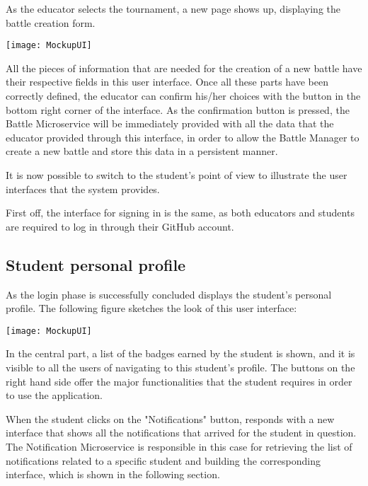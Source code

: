 As the educator selects the tournament, a new page shows up, displaying the battle creation form.

\begin{center}
	\texttt{[image: MockupUI]}
\end{center}

All the pieces of information that are needed for the creation of a new battle have their respective fields in this user interface. Once all these parts have been correctly defined, the educator can confirm his/her choices with the button in the bottom right corner of the interface. 
As the confirmation button is pressed, the Battle Microservice will be immediately provided with all the data that the educator provided through this interface, in order to allow the Battle Manager to create a new battle and store this data in a persistent manner.

It is now possible to switch to the student's point of view to illustrate the user interfaces that the \app system provides.

First off, the interface for signing in \app is the same, as both educators and students are required to log in through their GitHub account.

\subsection{Student personal profile}
As the login phase is successfully concluded \app displays the student's personal profile. The following figure sketches the look of this user interface:

\begin{center}
	\texttt{[image: MockupUI]}
\end{center}

In the central part, a list of the badges earned by the student is shown, and it is visible to all the users of \app navigating to this student's profile.
The buttons on the right hand side offer the major functionalities that the student requires in order to use the application.

When the student clicks on the "Notifications" button, \app responds with a new interface that shows all the notifications that arrived for the student in question. The Notification Microservice is responsible in this case for retrieving the list of notifications related to a specific student and building the corresponding interface, which is shown in the following section.


